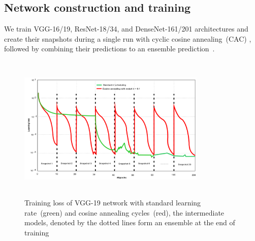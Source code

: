 \documentclass[conference]{IEEEtran}
\begin{document}
\subsection{Network construction and training}
We train VGG-16/19, ResNet-18/34, and DenseNet-161/201 architectures and create their snapshots during a single run with cyclic cosine annealing~(CAC)%
\cite{loshchilov2016sgdr}, followed by combining their predictions to an ensemble prediction~\cite{huang2017snapshot,karim2019snapshot}. 
\iffalse
\begin{figure}
    \centering
    \includegraphics[width=0.8\textwidth,height=70mm]{ca.png}
    \caption{Training loss of VGG-19 network with standard learning rate~(green) and cosine annealing cycles~(red), the intermediate models, denoted by the dotted lines form an ensemble at the end of training}
    \label{fig:cac}
\end{figure}
\end{document}
